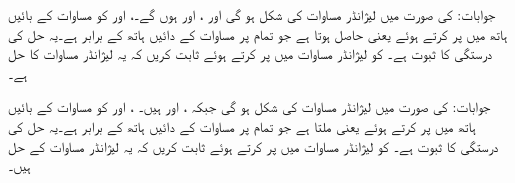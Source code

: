 جوابات: کی صورت میں لیژانڈر مساوات  کی شکل  ہو گی اور ،  اور  ہوں گے۔،  اور  کو مساوات کے بائیں ہاتھ میں پر کرتے ہوئے  یعنی  حاصل ہوتا ہے جو تمام  پر مساوات کے دائیں ہاتھ کے برابر ہے۔یہ حل کی درستگی کا ثبوت ہے۔
  کو لیژانڈر مساوات  میں پر کرتے ہوئے ثابت کریں کہ یہ لیژانڈر مساوات کا حل ہے۔

جوابات: کی صورت میں لیژانڈر مساوات  کی شکل  ہو گی جبکہ ،  اور  ہیں۔ ،  اور  کو مساوات کے بائیں ہاتھ میں پر کرتے ہوئے  یعنی  ملتا ہے جو تمام  پر مساوات کے دائیں ہاتھ کے برابر ہے۔یہ حل کی درستگی کا ثبوت ہے۔
  کو لیژانڈر مساوات  میں پر کرتے ہوئے ثابت کریں کہ یہ لیژانڈر مساوات کے حل ہیں۔

